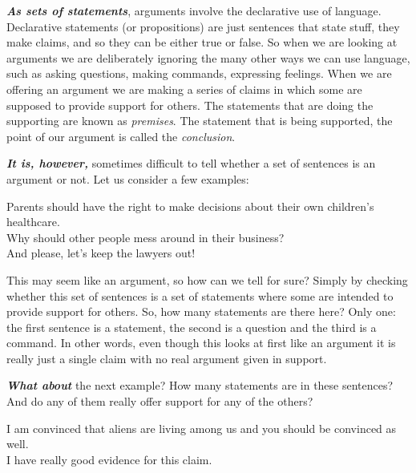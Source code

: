 \documentclass[12pt, openany]{book}
\begin{document}
\textbf{\emph{As sets of statements}}, arguments involve the declarative use of language. Declarative statements (or propositions) are just sentences that state stuff, they make claims, and so they can be either true or false. So when we are looking at arguments we are deliberately ignoring the many other ways we can use language, such as asking questions, making commands, expressing feelings. When we are offering an argument we are making a series of claims in which some are supposed to provide support for others. The statements that are doing the supporting are known as \emph{premises}. The statement that is being supported, the point of our argument is called the \emph{conclusion}.

\textbf{\emph{It is, however,}} sometimes difficult to tell whether a set of sentences is an argument or not. Let us consider a few examples:

\begin{center}

\begin{argument}

Parents should have the right to make decisions about their own children's healthcare.\\
Why should other people mess around in their business?\\
And please, let's keep the lawyers out!

\end{argument}

\end{center}

This may seem like an argument, so how can we tell for sure? Simply by checking whether this set of sentences is a set of statements where some are intended to provide support for others. So, how many statements are there here? Only one: the first sentence is a statement, the second is a question and the third is a command. In other words, even though this looks at first like an argument it is really just a single claim with no real argument given in support.

\textbf{\emph{What about}} the next example? How many statements are in these sentences? And do any of them really offer support for any of the others?

\begin{center}

\begin{argument}

I am convinced that aliens are living among us and you should be convinced as well.\\
I have really good evidence for this claim.

\end{argument}

\end{center}
\end{document}
